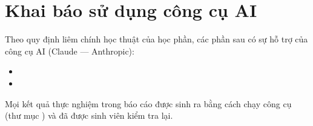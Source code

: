 \chapter{Khai báo sử dụng công cụ AI}
Theo quy định liêm chính học thuật của học phần, các phần sau có sự hỗ trợ của công cụ AI
(Claude — Anthropic):
\begin{itemize}
  \item {}
  \item {}
\end{itemize}
Mọi kết quả thực nghiệm trong báo cáo được sinh ra bằng cách chạy công cụ (thư mục
) và đã được sinh viên kiểm tra lại.
